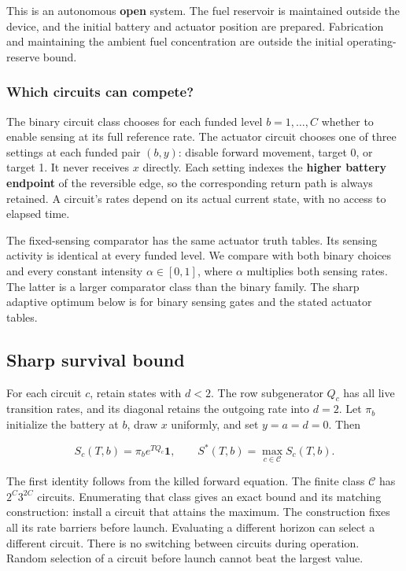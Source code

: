 \documentclass[
  11pt,
]{article}
\begin{document}
This is an autonomous \textbf{open} system. The fuel reservoir is
maintained outside the device, and the initial battery and actuator
position are prepared. Fabrication and maintaining the ambient fuel
concentration are outside the initial operating-reserve bound.

\subsubsection{Which circuits can
compete?}\label{which-circuits-can-compete}

The binary circuit class chooses for each funded level \(b=1,\ldots,C\)
whether to enable sensing at its full reference rate. The actuator
circuit chooses one of three settings at each funded pair \((b,y)\):
disable forward movement, target 0, or target 1. It never receives \(x\)
directly. Each setting indexes the \textbf{higher battery endpoint} of
the reversible edge, so the corresponding return path is always
retained. A circuit's rates depend on its actual current state, with no
access to elapsed time.

The fixed-sensing comparator has the same actuator truth tables. Its
sensing activity is identical at every funded level. We compare with
both binary choices and every constant intensity \(\alpha\in[0,1]\),
where \(\alpha\) multiplies both sensing rates. The latter is a larger
comparator class than the binary family. The sharp adaptive optimum
below is for binary sensing gates and the stated actuator tables.

\subsection{Sharp survival bound}\label{sharp-survival-bound}

For each circuit \(c\), retain states with \(d<2\). The row subgenerator
\(Q_c\) has all live transition rates, and its diagonal retains the
outgoing rate into \(d=2\). Let \(\pi_b\) initialize the battery at
\(b\), draw \(x\) uniformly, and set \(y=a=d=0\). Then

\[
 S_c(T,b)=\pi_b e^{TQ_c}\mathbf1,\qquad
 S^*(T,b)=\max_{c\in\mathcal C}S_c(T,b).
\]

The first identity follows from the killed forward equation. The finite
class \(\mathcal C\) has \(2^C3^{2C}\) circuits. Enumerating that class
gives an exact bound and its matching construction: install a circuit
that attains the maximum. The construction fixes all its rate barriers
before launch. Evaluating a different horizon can select a different
circuit. There is no switching between circuits during operation. Random
selection of a circuit before launch cannot beat the largest value.
\end{document}
